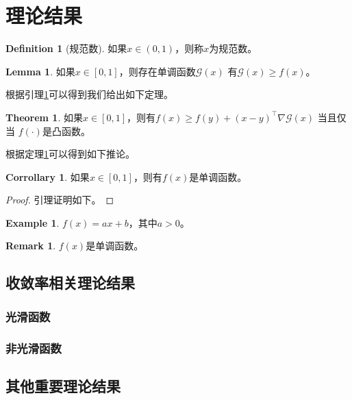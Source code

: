 \documentclass[a4paper,twoside,AutoFakeBold]{article}
\theoremstyle{definition}
\newtheorem{defn2}{{Definition}}
\newtheorem{corr2}{{Corrollary}}
\newtheorem{thrm2}{{Theorem}}
\newtheorem{lema2}{{Lemma}}
\newtheorem{exmp2}{{Example}}
\newtheorem{remark2}{{Remark}}
\begin{document}
\lipsum[8]

\lipsum[9]

\lipsum[10]

%
\section{理论结果}\label{section:theory}
\lipsum[16]
\begin{defn2}[规范数]\label{defn:theone}
如果$x \in (0,1)$，则称$x$为规范数。
\end{defn2}
\begin{lema2}\label{lema:theone}
如果$x \in [0,1]$，则存在单调函数$\mathcal{G}(x)$ 有$\mathcal{G}(x) \geq f(x)$。
\end{lema2}
根据引理\ref{lema:theone}可以得到我们给出如下定理。
\begin{thrm2}\label{thrm:theone}
如果$x \in [0,1]$，则有$f(x) \geq f(y) + (x-y)^{\top} \nabla \mathcal{G}(x)$ 当且仅当 $f(\cdot)$是凸函数。
\end{thrm2}
根据定理\ref{thrm:theone}可以得到如下推论。
\begin{corr2}\label{corr:theone}
如果$x \in [0,1]$，则有$f(x)$是单调函数。
\end{corr2}
\begin{proof}
引理证明如下。
\end{proof}
\begin{exmp2}\label{corr:theone}
$f(x)= ax + b$，其中$a>0$。
\end{exmp2}

\begin{remark2}\label{remark:theone}
$f(x)$是单调函数。
\end{remark2}

\lipsum[28-29]
\subsection{收敛率相关理论结果}
\lipsum[31]
\subsubsection{光滑函数}
\lipsum[32]
\subsubsection{非光滑函数}
\lipsum[33]

\subsection{其他重要理论结果}
\lipsum[36]
\end{document}
